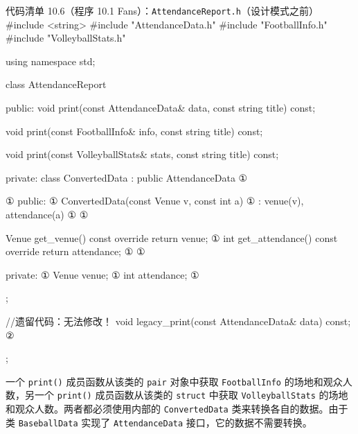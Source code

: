 \begin{codeboxt}{代码清单 10.6（程序 10.1 Fans）：\texttt{Attendance\allowbreak{}Report.\allowbreak{}h}（设计模式之前）}
#include <string>
#include "AttendanceData.h"
#include "FootballInfo.h"
#include "VolleyballStats.h"

using namespace std;

class AttendanceReport
{
public:
    void print(const AttendanceData& data,
               const string title) const;

    void print(const FootballInfo& info,
               const string title) const;

    void print(const VolleyballStats& stats,
               const string title) const;

private:
    class ConvertedData : public AttendanceData                      ①
    {                                                                ①
    public:                                                          ①
        ConvertedData(const Venue v, const int a)                    ①
            : venue(v), attendance(a) {}                             ①
                                                                     ①

        Venue get_venue()      const override { return venue; }      ①
        int   get_attendance() const override { return attendance; } ①
                                                                     ①

    private:                                                         ①
        Venue venue;                                                 ①
        int   attendance;                                            ①
    };

    //遗留代码：无法修改！
    void legacy_print(const AttendanceData& data) const;             ②
};
\end{codeboxt}
\par
{}\par


一个 \texttt{print()} 成员函数从该类的 \texttt{pair} 对象中获取 \texttt{Football\allowbreak{}Info} 的场地和观众人数，另一个 \texttt{print()} 成员函数从该类的 \texttt{struct} 中获取 \texttt{Volleyball\allowbreak{}Stats} 的场地和观众人数。两者都必须使用内部的 \texttt{Converted\allowbreak{}Data} 类来转换各自的数据。由于类 \texttt{Baseball\allowbreak{}Data} 实现了 \texttt{Attendance\allowbreak{}Data} 接口，它的数据不需要转换。

